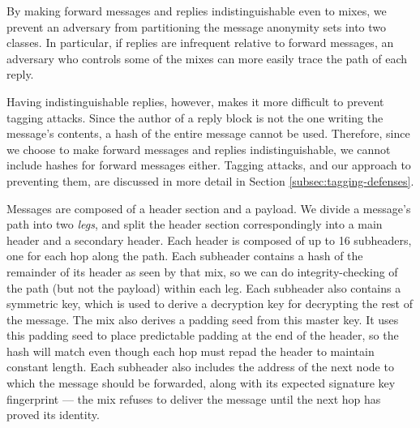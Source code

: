 \documentclass[11pt]{IEEEtran}
\begin{document}
By making forward messages and replies indistinguishable even to mixes,
we prevent an
adversary from partitioning the message anonymity sets into two classes. In
particular, if replies are infrequent relative to forward messages,
an adversary who controls some of the mixes can more easily trace the
path of each reply.

Having indistinguishable replies, however, makes it more difficult to
prevent tagging attacks.  Since the author of a reply block is not the
one writing the message's contents, a hash of the entire message cannot be used.
Therefore, since we choose to make forward messages and replies
indistinguishable, we cannot include hashes for forward messages either.
Tagging attacks, and our approach to preventing them, are discussed in more
detail in Section \ref{subsec:tagging-defenses}.


Messages are composed of a header section and a payload. We divide
a message's path into two \emph{legs}, and split the header section
correspondingly into a main header and a secondary header. Each header
is composed of up to 16 subheaders, one for each hop along the path.
Each subheader contains a hash of the remainder of its header as
seen by that mix, so we can do
integrity-checking of the path (but not the payload) within each leg.
Each subheader also contains a symmetric key, which is used to derive a
decryption key for decrypting the rest of the message. The mix also
derives a padding seed from this master key. It uses this padding seed
to place predictable padding at the end of the header, so the hash will
match even though each hop must repad the header to maintain constant
length. Each subheader also includes the address of the next node to which
the message should be forwarded, along with its expected signature key
fingerprint --- the mix refuses to deliver the message until the next
hop has proved its identity.
\end{document}
